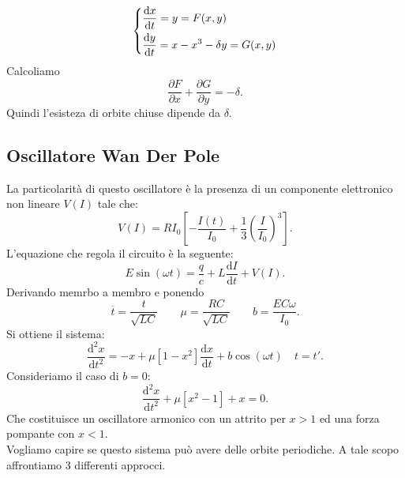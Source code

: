 \begin{exmp}[]
    \[
    \begin{dcases}
	\frac{\text{d} x}{\text{d} t} = y = F(x, y) \\
	\frac{\text{d} y}{\text{d} t} = x-x^3-\delta y = G(x, y) 
    \end{dcases}
    \]
    Calcoliamo 
    \[
        \frac{\partial F}{\partial x} + \frac{\partial G}{\partial y} = -\delta
    .\] 
    Quindi l'esisteza di orbite chiuse dipende da $\delta$.
\end{exmp}
\subsection{Oscillatore Wan Der Pole}%
\label{sub:Oscillatore Wan Der Pole}
La particolarità di questo oscillatore è la presenza di un componente elettronico non lineare $V(I)$ tale che:
\[
    V(I) = RI_0\left[- \frac{I(t) }{I_0} + \frac{1}{3}\left(\frac{I}{I_0}\right)^3\right]
.\] 
L'equazione che regola il circuito è la seguente:
\[
    E\sin (\omega t) = \frac{q}{c}+ L\frac{\text{d} I}{\text{d} t}  + V(I) 
.\] 
Derivando memrbo a membro e ponendo
\[
    \overline{t} = \frac{t}{\sqrt{LC}} \qquad  \mu= \frac{RC}{\sqrt{LC} } \qquad  b = \frac{E C \omega}{I_0}
.\] 
Si ottiene il sistema:
\[
    \frac{\text{d} ^2x}{\text{d} t^2} = -x + \mu \left[1-x^2\right]\frac{\text{d} x}{\text{d} t} + b \cos (\omega t) \quad  t = t'
.\] 
Consideriamo il caso di $b = 0$:
\[
    \frac{\text{d} ^2x}{\text{d} t^2} + \mu\left[x^2-1\right]+x = 0
.\] 
Che costituisce un oscillatore armonico con un attrito per $x > 1$ ed una forza pompante con $x<1$.\\
Vogliamo capire se questo sistema può avere delle orbite periodiche. A tale scopo affrontiamo 3 differenti approcci.
